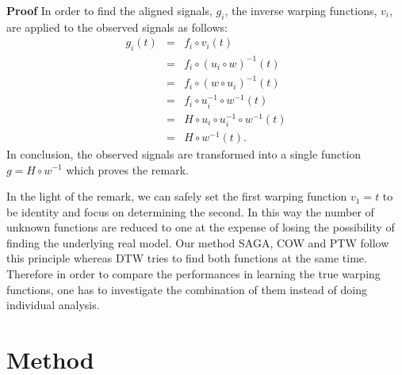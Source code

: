 \documentclass[number,1p,12pt]{elsarticle}
\begin{document}
{\bf Proof }
In order to find the aligned signals, $g_i$, the inverse warping functions, $v_i$, are applied to the observed signals as follows:
\begin{eqnarray}
g_i(t)                 & = & f_i  \circ v_i(t) \nonumber\\
                         & = & f_i  \circ (u_i \circ w)^{-1}(t) \nonumber\\
                         & = & f_i  \circ (w \circ u_i)^{-1}(t) \nonumber\\
                         & = & f_i  \circ u_i^{-1}\circ w^{-1}(t) \nonumber\\
                         & = & H\circ u_i \circ u_i^{-1}\circ w^{-1}(t) \nonumber\\
                         & = & H\circ w^{-1}(t). 
\end{eqnarray}
In conclusion, the observed signals are transformed into a single function $g = H\circ w^{-1}$ which proves the remark.

In the light of the remark, we can safely set the first warping function $v_1=t$ to be identity and focus on determining the second. In this way the number of unknown functions are reduced to one at the expense of losing the possibility of finding the underlying real model. Our method SAGA, COW and PTW follow this principle whereas DTW tries to find both functions at the same time. Therefore in order to compare the performances in learning the true warping functions, one has to investigate the combination of them instead of doing individual analysis.

\section{Method}
\end{document}
